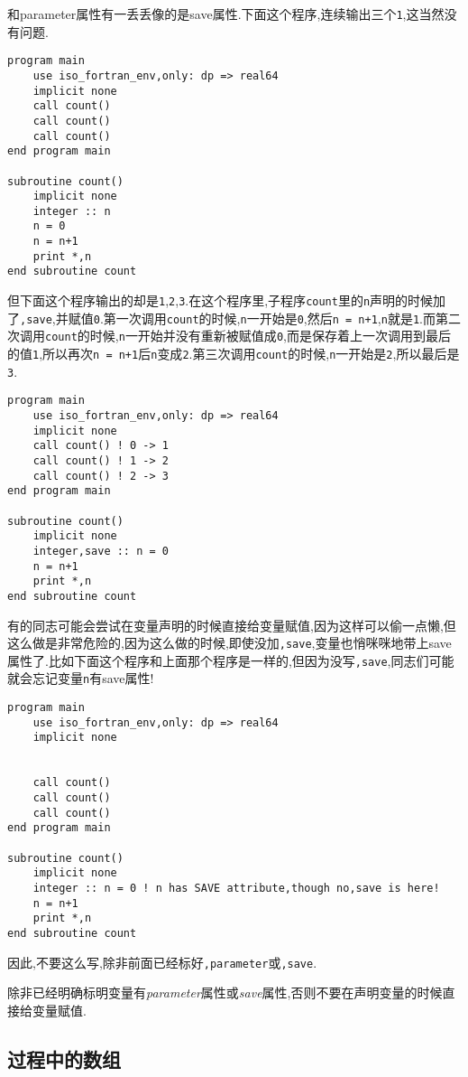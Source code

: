和parameter属性有一丢丢像的是save属性.下面这个程序,连续输出三个\texttt{1},这当然没有问题.
\begin{lstlisting}
program main
    use iso_fortran_env,only: dp => real64
    implicit none
    call count()
    call count()
    call count()
end program main

subroutine count()
    implicit none
    integer :: n
    n = 0
    n = n+1
    print *,n
end subroutine count
\end{lstlisting}
但下面这个程序输出的却是\texttt{1},\texttt{2},\texttt{3}.在这个程序里,子程序\texttt{count}里的\texttt{n}声明的时候加了\texttt{,save},并赋值\texttt{0}.第一次调用\texttt{count}的时候,\texttt{n}一开始是\texttt{0},然后\texttt{n = n+1},\texttt{n}就是\texttt{1}.而第二次调用\texttt{count}的时候,\texttt{n}一开始并没有重新被赋值成\texttt{0},而是保存着上一次调用到最后的值\texttt{1},所以再次\texttt{n = n+1}后\texttt{n}变成\texttt{2}.第三次调用\texttt{count}的时候,\texttt{n}一开始是\texttt{2},所以最后是\texttt{3}.
\begin{lstlisting}
program main
    use iso_fortran_env,only: dp => real64
    implicit none
    call count() ! 0 -> 1
    call count() ! 1 -> 2
    call count() ! 2 -> 3
end program main

subroutine count()
    implicit none
    integer,save :: n = 0
    n = n+1
    print *,n
end subroutine count
\end{lstlisting}
有的同志可能会尝试在变量声明的时候直接给变量赋值,因为这样可以偷一点懒,但这么做是非常危险的,因为这么做的时候,即使没加\texttt{,save},变量也悄咪咪地带上save属性了.比如下面这个程序和上面那个程序是一样的,但因为没写\texttt{,save},同志们可能就会忘记变量\texttt{n}有save属性!
\begin{lstlisting}
program main
    use iso_fortran_env,only: dp => real64
    implicit none


    call count()
    call count()
    call count()
end program main

subroutine count()
    implicit none
    integer :: n = 0 ! n has SAVE attribute,though no,save is here!
    n = n+1
    print *,n
end subroutine count
\end{lstlisting}
因此,不要这么写,除非前面已经标好\texttt{,parameter}或\texttt{,save}.

\begin{convention}
    除非已经明确标明变量有\emph{parameter}属性或\emph{save}属性,否则不要在声明变量的时候直接给变量赋值.
\end{convention}

\subsection{过程中的数组}

